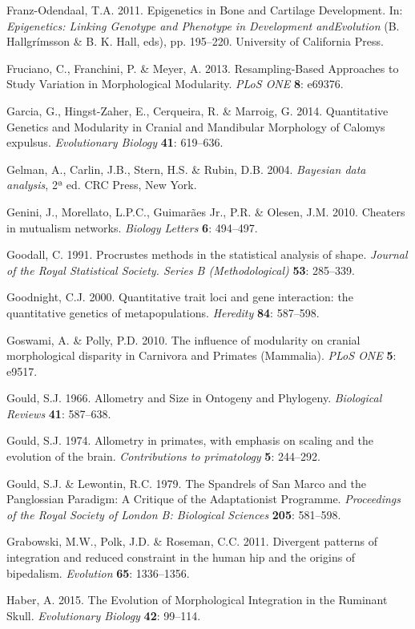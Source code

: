 \documentclass[12pt,twoside]{report}
\begin{document}
Franz-Odendaal, T.A. 2011. Epigenetics in Bone and Cartilage
Development. In: \emph{Epigenetics: Linking Genotype and Phenotype in
Development andEvolution} (B. Hallgrímsson \& B. K. Hall, eds), pp.
195--220. University of California Press.

Fruciano, C., Franchini, P. \& Meyer, A. 2013. Resampling-Based
Approaches to Study Variation in Morphological Modularity. \emph{PLoS
ONE} \textbf{8}: e69376.

Garcia, G., Hingst-Zaher, E., Cerqueira, R. \& Marroig, G. 2014.
Quantitative Genetics and Modularity in Cranial and Mandibular
Morphology of Calomys expulsus. \emph{Evolutionary Biology} \textbf{41}:
619--636.

Gelman, A., Carlin, J.B., Stern, H.S. \& Rubin, D.B. 2004.
\emph{Bayesian data analysis}, 2ª ed. CRC Press, New York.

Genini, J., Morellato, L.P.C., Guimarães Jr., P.R. \& Olesen, J.M. 2010.
Cheaters in mutualism networks. \emph{Biology Letters} \textbf{6}:
494--497.

Goodall, C. 1991. Procrustes methods in the statistical analysis of
shape. \emph{Journal of the Royal Statistical Society. Series B
(Methodological)} \textbf{53}: 285--339.

Goodnight, C.J. 2000. Quantitative trait loci and gene interaction: the
quantitative genetics of metapopulations. \emph{Heredity} \textbf{84}:
587--598.

Goswami, A. \& Polly, P.D. 2010. The influence of modularity on cranial
morphological disparity in Carnivora and Primates (Mammalia). \emph{PLoS
ONE} \textbf{5}: e9517.

Gould, S.J. 1966. Allometry and Size in Ontogeny and Phylogeny.
\emph{Biological Reviews} \textbf{41}: 587--638.

Gould, S.J. 1974. Allometry in primates, with emphasis on scaling and
the evolution of the brain. \emph{Contributions to primatology}
\textbf{5}: 244--292.

Gould, S.J. \& Lewontin, R.C. 1979. The Spandrels of San Marco and the
Panglossian Paradigm: A Critique of the Adaptationist Programme.
\emph{Proceedings of the Royal Society of London B: Biological Sciences}
\textbf{205}: 581--598.

Grabowski, M.W., Polk, J.D. \& Roseman, C.C. 2011. Divergent patterns of
integration and reduced constraint in the human hip and the origins of
bipedalism. \emph{Evolution} \textbf{65}: 1336--1356.

Haber, A. 2015. The Evolution of Morphological Integration in the
Ruminant Skull. \emph{Evolutionary Biology} \textbf{42}: 99--114.
\end{document}

